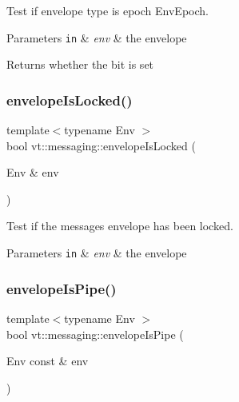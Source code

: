 Test if envelope type is epoch {\ttfamily Env\+Epoch}. 


\begin{DoxyParams}[1]{Parameters}
\mbox{\tt in}  & {\em env} & the envelope\\
\hline
\end{DoxyParams}
\begin{DoxyReturn}{Returns}
whether the bit is set 
\end{DoxyReturn}
\mbox{\label{namespacevt_1_1messaging_a6129f4cbd5fd124f342d1235694f664d}} 
\subsubsection{\texorpdfstring{envelope\+Is\+Locked()}{envelopeIsLocked()}}
{\footnotesize\ttfamily template$<$typename Env $>$ \\
bool vt\+::messaging\+::envelope\+Is\+Locked (\begin{DoxyParamCaption}\item[{Env \&}]{env }\end{DoxyParamCaption})\hspace{0.3cm}{\ttfamily [inline]}}



Test if the message\textquotesingle{}s envelope has been locked. 


\begin{DoxyParams}[1]{Parameters}
\mbox{\tt in}  & {\em env} & the envelope \\
\hline
\end{DoxyParams}
\mbox{\label{namespacevt_1_1messaging_af97867f7e468ce73a69cd228404c47b0}} 
\subsubsection{\texorpdfstring{envelope\+Is\+Pipe()}{envelopeIsPipe()}}
{\footnotesize\ttfamily template$<$typename Env $>$ \\
bool vt\+::messaging\+::envelope\+Is\+Pipe (\begin{DoxyParamCaption}\item[{Env const \&}]{env }\end{DoxyParamCaption})\hspace{0.3cm}{\ttfamily [inline]}}



